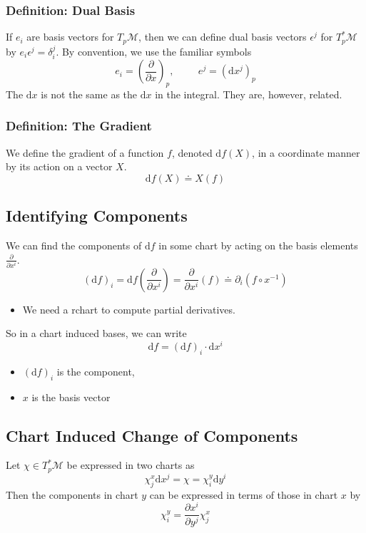 \documentclass[10pt]{article}
\begin{document}
\subsubsection*{Definition: Dual Basis}
If $e_i$ are basis vectors for $T_p \mathcal{M}$, then we can define dual basis vectors $\epsilon^j$ for $T_p^* \mathcal{M}$ by $e_i \epsilon^j = \delta_i^j$.  By convention, we use the familiar symbols
\[e_i = \left(\frac{\partial}{\partial x}\right)_p, \hspace{1cm} e^j = (\text{d}x^j)_p\]
The $\text{d}x$ is not the same as the $\text{d}x$ in the integral. They are, however, related.

\subsubsection*{Definition: The Gradient}
We define the gradient of a function $f$, denoted $\text{d}f(X)$, in a coordinate manner by its action on a vector $X$.
\[\text{d}f(X) \doteq X(f)\]

\subsection*{Identifying Components}
We can find the components of $\text{d}f$ in some chart by acting on the basis elements $\frac{\partial}{\partial x^i}$.\\
\[(\text{d}f)_i = \text{d}f \left(\frac{\partial}{\partial x^i}\right) = \frac{\partial}{\partial x^i}(f) \doteq \partial_i (f \circ x^{-1})\]
\begin{itemize}
    \item We need a rchart to compute partial derivatives.
\end{itemize}
So in a chart induced bases, we can write
\[\text{d}f = (\text{d}f)_i \cdot \text{d}x^i\]
\begin{itemize}
    \item $(\text{d}f)_i$ is the component,
    \item $x$ is the basis vector
\end{itemize}

\subsection*{Chart Induced Change of Components}
Let $\chi \in T_p^* \mathcal{M}$ be expressed in two charts as
\[\chi_j^x \text{d}x^j = \chi = \chi_i^y \text{d}y^i\]
Then the components in chart $y$ can be expressed in terms of those in chart $x$ by
\[\chi_i^y = \frac{\partial x^i}{\partial y^j} \chi_j^x\]
\end{document}
